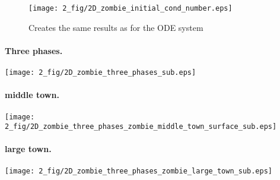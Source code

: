 \documentclass[%
twoside,                 %
final,                   %
chapterprefix=true,      %
open=right               %
10pt]{book}
\begin{document}
\begin{figure}[ht]
  \centerline{\texttt{[image: 2\_fig/2D\_zombie\_initial\_cond\_number.eps]}}
  \caption{
  Creates the same results as for the ODE system
  }
\end{figure}


\paragraph{Three phases.}
\begin{center}  %
  \centerline{\texttt{[image: 2\_fig/2D\_zombie\_three\_phases\_sub.eps]}}
\end{center}


\paragraph{middle town.}
\begin{center}  %
  \centerline{\texttt{[image: 2\_fig/2D\_zombie\_three\_phases\_zombie\_middle\_town\_surface\_sub.eps]}}
\end{center}


\paragraph{large town.}
\begin{center}  %
  \centerline{\texttt{[image: 2\_fig/2D\_zombie\_three\_phases\_zombie\_large\_town\_sub.eps]}}
\end{center}
\end{document}
